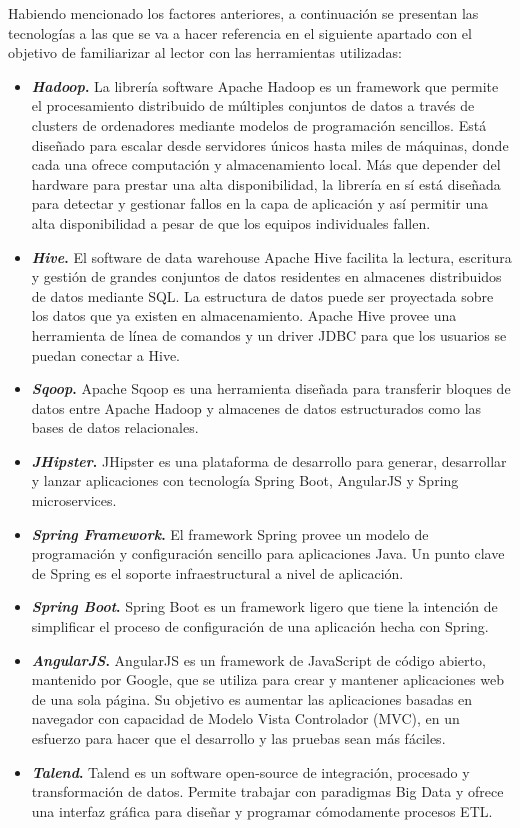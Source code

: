 Habiendo mencionado los factores anteriores, a continuación se presentan las tecnologías a las que se va a hacer referencia en el siguiente apartado con el objetivo de familiarizar al lector con las herramientas utilizadas:
\begin{itemize}
\item \textbf{\textit{Hadoop}.} \cite{hadoop} La librería software Apache Hadoop es un framework que permite el procesamiento distribuido de múltiples conjuntos de datos a través de clusters de ordenadores mediante modelos de programación sencillos. Está diseñado para escalar desde servidores únicos hasta miles de máquinas, donde cada una ofrece computación y almacenamiento local. Más que depender del hardware para prestar una alta disponibilidad, la librería en sí está diseñada para detectar y gestionar fallos en la capa de aplicación y así permitir una alta disponibilidad a pesar de que los equipos individuales fallen. 
\item \textbf{\textit{Hive}.} \cite{hive}  El software de data warehouse Apache Hive facilita la lectura, escritura y gestión de grandes conjuntos de datos residentes en almacenes distribuidos de datos mediante SQL. La estructura de datos puede ser proyectada sobre los datos que ya existen en almacenamiento. Apache Hive provee una herramienta de línea de comandos y un driver JDBC para que los usuarios se puedan conectar a Hive. 
\item \textbf{\textit{Sqoop}.} \cite{sqoop} Apache Sqoop es una herramienta diseñada para transferir bloques de datos entre Apache Hadoop y almacenes de datos estructurados como las bases de datos relacionales.
\item \textbf{\textit{JHipster}.} \cite{jhipster} JHipster es una plataforma de desarrollo para generar, desarrollar y lanzar aplicaciones con tecnología Spring Boot, AngularJS y Spring microservices. 
\item \textbf{\textit{Spring Framework}.} \cite{springframework} El framework Spring provee un modelo de programación y configuración sencillo para aplicaciones Java. Un punto clave de Spring es el soporte infraestructural a nivel de aplicación. 
\item \textbf{\textit{Spring Boot}.} \cite{springboot} Spring Boot es un framework ligero que tiene la intención de simplificar el proceso de configuración de una aplicación hecha con Spring. 
\item \textbf{\textit{AngularJS}.} \cite{angularjs} AngularJS es un framework de JavaScript de código abierto, mantenido por Google, que se utiliza para crear y mantener aplicaciones web de una sola página. Su objetivo es aumentar las aplicaciones basadas en navegador con capacidad de Modelo Vista Controlador (MVC), en un esfuerzo para hacer que el desarrollo y las pruebas sean más fáciles.
\item \textbf{\textit{Talend}.} \cite{talend} Talend es un software open-source de integración, procesado y transformación de datos. Permite trabajar con paradigmas Big Data y ofrece una interfaz gráfica para diseñar y programar cómodamente procesos ETL. 
\end{itemize}

